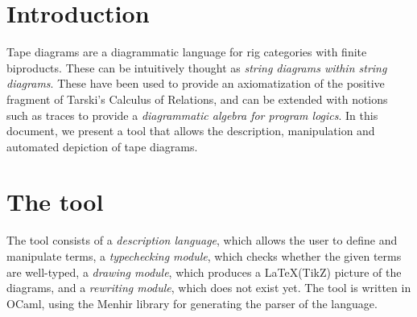 \documentclass{article}
\begin{document}
\section{Introduction}

Tape diagrams are a diagrammatic language for rig categories with finite biproducts. These can be intuitively thought as \emph{string diagrams within string diagrams}. These have been used to provide an axiomatization of the positive fragment of Tarski's Calculus of Relations, and can be extended with notions such as traces to provide a \emph{diagrammatic algebra for program logics}. In this document, we present a tool that allows the description, manipulation and automated depiction of tape diagrams.

% 

\section{The tool}
The tool consists of a \emph{description language}, which allows the user to define and manipulate terms, a \emph{typechecking module}, which checks whether the given terms are well-typed,  a \emph{drawing module}, which produces a \LaTeX \;(TikZ) picture of the diagrams, and a \emph{rewriting module}, which {\color{red} does not exist yet}. The tool is written in OCaml, using the Menhir library for generating the parser of the language.



\clearpage
\newpage

\newpage

\appendix

\end{document}
